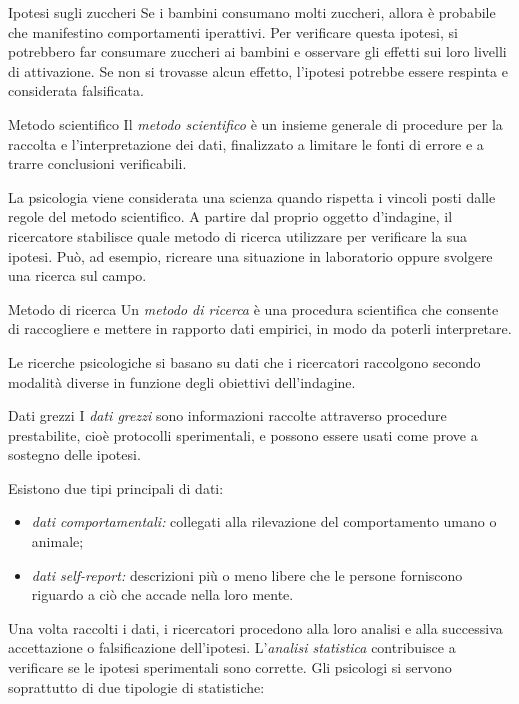 \documentclass[a4paper]{article}
\begin{document}
\begin{snippetexample}{Ipotesi sugli zuccheri}
    Se i bambini consumano molti zuccheri, allora è probabile che manifestino comportamenti iperattivi. Per verificare questa ipotesi, si potrebbero far consumare zuccheri ai bambini e osservare gli effetti sui loro livelli di attivazione. Se non si trovasse alcun effetto, l'ipotesi potrebbe essere respinta e considerata falsificata.
\end{snippetexample}
\begin{snippetdefinition}{Metodo scientifico}
    Il \emph{metodo scientifico} è un insieme generale di procedure per la raccolta e l'interpretazione dei dati, finalizzato a limitare le fonti di errore e a trarre conclusioni verificabili.
\end{snippetdefinition}
La psicologia viene considerata una scienza quando rispetta i vincoli posti dalle regole del metodo scientifico.
A partire dal proprio oggetto d'indagine, il ricercatore stabilisce quale metodo di ricerca utilizzare per verificare la sua ipotesi. Può, ad esempio, ricreare una situazione in laboratorio oppure svolgere una ricerca sul campo.
\begin{snippetdefinition}{Metodo di ricerca}
    Un \emph{metodo di ricerca} è una procedura scientifica che consente di raccogliere e mettere in rapporto dati empirici, in modo da poterli interpretare.
\end{snippetdefinition}
Le ricerche psicologiche si basano su dati che i ricercatori raccolgono secondo modalità diverse in funzione degli obiettivi dell'indagine.
\begin{snippetdefinition}{Dati grezzi}
    I \emph{dati grezzi} sono informazioni raccolte attraverso procedure prestabilite, cioè protocolli sperimentali, e possono essere usati come prove a sostegno delle ipotesi.
\end{snippetdefinition}
Esistono due tipi principali di dati:
\begin{itemize}
    \item \emph{dati comportamentali:} collegati alla rilevazione del comportamento umano o animale;
    \item \emph{dati self-report:} descrizioni più o meno libere che le persone forniscono riguardo a ciò che accade nella loro mente.
\end{itemize}
Una volta raccolti i dati, i ricercatori procedono alla loro analisi e alla successiva accettazione o falsificazione dell'ipotesi.
L'\emph{analisi statistica} contribuisce a verificare se le ipotesi sperimentali sono corrette. Gli psicologi si servono soprattutto di due tipologie di statistiche:
\end{document}
